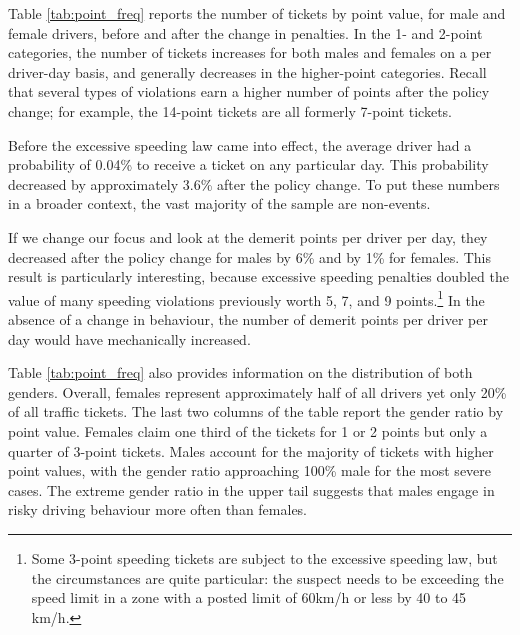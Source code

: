 \documentclass{cje}
\begin{document}
Table \ref{tab:point_freq} reports 
the number of tickets by point value, 
for male and female drivers, before and after the
change in penalties. 
%
In the 1- and 2-point categories, the number of tickets increases 
for both males and females on a per driver-day basis, 
and generally decreases in the higher-point categories. 
% 
Recall that several types of violations
earn a higher number of points after the policy change; 
for example, 
the 14-point tickets are all formerly 7-point tickets.

Before the excessive speeding law came into effect, 
the average driver had a probability of 0.04\% to receive a ticket 
on any particular day. This probability decreased by approximately 3.6\% after the policy change.
To put these numbers in a broader context, 
the vast majority of the sample are non-events. 

If we change our focus and look at the demerit points per driver per day, 
they decreased after the policy change for males by 6\% and by 1\% for females. 
This result is particularly interesting, 
because excessive speeding penalties doubled the value of many 
speeding violations previously worth 5, 7, and 9 points.\footnote{%
Some 3-point speeding tickets are subject to the excessive speeding law, 
but the circumstances are quite particular: 
the suspect needs to be exceeding the speed limit in a zone 
with a posted limit of 60km/h or less by 40 to 45 km/h.}
In the absence of a change in behaviour, 
the number of demerit points per driver per day 
would have mechanically increased. 


Table \ref{tab:point_freq} also provides information on the distribution of both genders. Overall, females represent approximately half of all drivers 
yet only 20\% of all traffic tickets. 
%
The last two columns of the table
report the gender ratio by point value.
% 
Females claim one third of the tickets for 1 or 2 points
but only a quarter of 3-point tickets. 
Males account for the majority of tickets with higher point values, 
with the gender ratio approaching 100\% male 
for the most severe cases. 
% 
The extreme gender ratio in the upper tail suggests that males engage in risky driving behaviour 
more often than females. 

%
\end{document}

